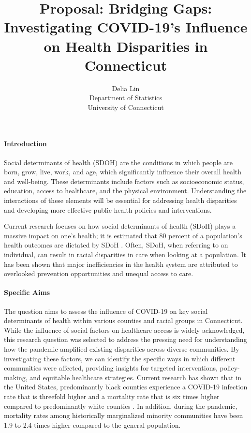 \documentclass[12pt]{article}
\title{Proposal: Bridging Gaps: Investigating COVID-19's Influence on Health Disparities in Connecticut}
\author{Delia Lin\\
  Department of Statistics\\
  University of Connecticut
}
\begin{document}
\maketitle


\paragraph{Introduction}
Social determinants of health (SDOH) are the conditions in which people are born, 
grow, live, work, and age, which significantly influence their overall health and 
well-being. These determinants include factors such as socioeconomic status, education, 
access to healthcare, and the physical environment. Understanding the interactions of 
these elements will be essential for addressing health disparities and developing more 
effective public health policies and interventions.

Current research focuses on how social determinants of health (SDoH) plays a  massive
impact on one's health; it is estimated that 80 percent of a population's health outcomes are 
dictated by SDoH \citep{HOOD2016129}. Often, SDoH, when referring to an individual, can result in racial 
disparities in care when looking at a population\citep{Monroe2023-uq}. It has been shown that major inefficiencies
in the health system are attributed to overlooked prevention opportunities and unequal access
to care.\citep{Allin2014-xn}

\paragraph{Specific Aims}
The question aims to assess the influence of COVID-19 on key social determinants of health 
within various counties and racial groups in Connecticut. While the influence of social factors 
on healthcare access is widely acknowledged, this research question was selected to address the 
pressing need for understanding how the pandemic amplified existing disparities across diverse 
communities. By investigating these factors, we can identify the 
specific ways in which different communities were affected, providing insights for 
targeted interventions, policy-making, and equitable healthcare strategies. 
Current research has shown that in the United States, predominantly black counties experience a 
COVID-19 infection rate that is threefold higher and a mortality rate that is six times higher 
compared to predominantly white counties \citep{Yancy2020-cz}. In addition, during the pandemic, mortality 
rates among historically marginalized minority communities have been 1.9 to 2.4 times higher 
compared to the general population.\citep{Badalov2022-wt}
\end{document}
